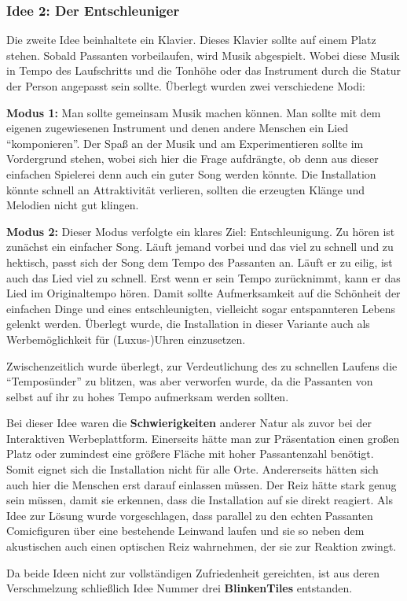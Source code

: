 \subsubsection{Idee 2: Der Entschleuniger}

Die zweite Idee beinhaltete ein Klavier. Dieses Klavier sollte auf einem Platz stehen. Sobald Passanten vorbeilaufen, wird Musik abgespielt. Wobei diese Musik in Tempo des Laufschritts und die Tonhöhe oder das Instrument durch die Statur der Person angepasst sein sollte. Überlegt wurden zwei verschiedene Modi:

\textbf{Modus 1:} Man sollte gemeinsam Musik machen können. Man sollte mit dem eigenen zugewiesenen Instrument und denen andere Menschen ein Lied \enquote{komponieren}. Der Spaß an der Musik und am Experimentieren sollte im Vordergrund stehen, wobei sich hier die Frage aufdrängte, ob denn aus dieser einfachen Spielerei denn auch ein guter Song werden könnte. Die Installation könnte schnell an Attraktivität verlieren, sollten die erzeugten Klänge und Melodien nicht gut klingen.

\textbf{Modus 2:} Dieser Modus verfolgte ein klares Ziel: Entschleunigung. Zu hören ist zunächst ein einfacher Song. Läuft jemand vorbei und das viel zu schnell und zu hektisch, passt sich der Song dem Tempo des Passanten an. Läuft er zu eilig, ist auch das Lied viel zu schnell. Erst wenn er sein Tempo zurücknimmt, kann er das Lied im Originaltempo hören. Damit sollte Aufmerksamkeit auf die Schönheit der einfachen Dinge und eines entschleunigten, vielleicht sogar entspannteren Lebens gelenkt werden. Überlegt wurde, die Installation in dieser Variante auch als Werbemöglichkeit für (Luxus-)Uhren einzusetzen.

Zwischenzeitlich wurde überlegt, zur Verdeutlichung des zu schnellen Laufens die \enquote{Temposünder} zu blitzen, was aber verworfen wurde, da die Passanten von selbst auf ihr zu hohes Tempo aufmerksam werden sollten.

Bei dieser Idee waren die \textbf{Schwierigkeiten} anderer Natur als zuvor bei der Interaktiven Werbeplattform. Einerseits hätte man zur Präsentation einen großen Platz oder zumindest eine größere Fläche mit hoher Passantenzahl benötigt. Somit eignet sich die Installation nicht für alle Orte. Andererseits hätten sich auch hier die Menschen erst darauf einlassen müssen. Der Reiz hätte stark genug sein müssen, damit sie erkennen, dass die Installation auf sie direkt reagiert. Als Idee zur Lösung wurde vorgeschlagen, dass parallel zu den echten Passanten Comicfiguren über eine bestehende Leinwand laufen und sie so neben dem akustischen auch einen optischen Reiz wahrnehmen, der sie zur Reaktion zwingt.

Da beide Ideen nicht zur vollständigen Zufriedenheit gereichten, ist aus deren Verschmelzung schließlich Idee Nummer drei \textbf{BlinkenTiles} entstanden.